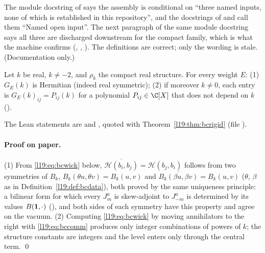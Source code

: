 \begin{warning}[title={Stale ``open input'' language in \texttt{AffineSl2BelowCriticalGradedUnitarity.lean}}]\label{l19:warn:bcstale}
The module docstring of  says the assembly is conditional on ``three
named inputs, none of which is established in this repository'', and the docstrings of  and
 call them ``Named open input''. The next paragraph of the same module docstring says all three
are discharged downstream for the compact family, which is what the machine confirms
(, , ). The definitions
are correct; only the wording is stale. (Documentation only.)
\end{warning}

\begin{lemma}\label{l19:lem:bcgram}
Let $k$ be real, $k\ne-2$, and $\rho_k$ the compact real structure. For every weight $E$: (1) $G_E(k)$ is Hermitian (indeed real
symmetric); (2) if moreover $k\ne0$, each entry is $G_E(k)_{ij} = P_{ij}(k)$ for a polynomial $P_{ij}\in\C[X]$ that does not depend
on $k$ ().
\end{lemma}
\noindent The Lean statements are  and , quoted with
Theorem~\ref{l19:thm:bcrigid} (file ).

\paragraph{Proof on paper.} (1) From \eqref{l19:eq:bcwick} below, $\overline{\mathcal H(b_i,b_j)} = \mathcal H(b_j,b_i)$ follows from two
symmetries of $B_k$, $B_k(\theta u,\theta v) = B_k(u,v)$ and $\overline{B_k(\beta u,\beta v)} = B_k(u,v)$ ($\theta$, $\beta$ as in
Definition~\ref{l19:def:bcdata}), both proved by the same uniqueness principle: a bilinear form for which every $J^a_m$ is
skew-adjoint to $J^a_{-m}$ is determined by its values $B(\mathbf{1},\cdot)$ (), and both
sides of each symmetry have this property and agree on the vacuum. (2) Computing \eqref{l19:eq:bcwick} by moving annihilators to
the right with \eqref{l19:eq:bccomm} produces only integer combinations of powers of $k$; the structure constants are
integers and the level enters only through the central term. \qed

